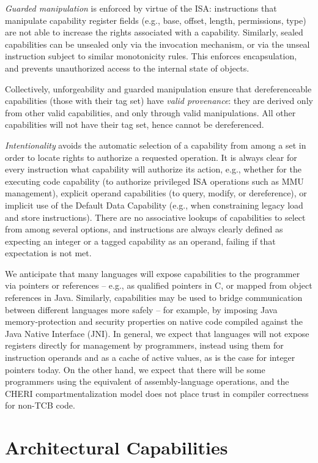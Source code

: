 \textit{Guarded manipulation} is enforced by virtue of the ISA: instructions
that manipulate capability register fields (e.g., base, offset, length,
permissions, type) are not able to increase the rights associated with a
capability.
Similarly, sealed capabilities can be unsealed only via the invocation
mechanism, or via the unseal instruction subject to similar monotonicity
rules.
This enforces encapsulation, and prevents unauthorized access to the internal
state of objects.

Collectively, unforgeability and guarded manipulation ensure that
dereferenceable capabilities (those with their tag set) have \textit{valid
provenance}: they are derived only from other valid capabilities, and only
through valid manipulations.
All other capabilities will not have their tag set, hence cannot be
dereferenced.

\textit{Intentionality} avoids the automatic selection of a capability from
among a set in order to locate rights to authorize a requested operation.
It is always clear for every instruction what capability will authorize its
action,
e.g.,
whether
for the executing code capability (to authorize privileged ISA
operations such as MMU management), explicit operand capabilities (to query,
modify, or dereference), or implicit use of the Default Data Capability (e.g.,
when constraining legacy load and store instructions).
There are no associative lookups of capabilities to select from among several
options, and instructions are always clearly defined as expecting an integer
or a tagged capability as an operand, failing if that expectation is not met.

We anticipate that many languages will expose capabilities to the programmer
via pointers or references -- e.g., as qualified pointers in C, or mapped from
object references in Java.
Similarly, capabilities may be used to bridge communication between different
languages more safely -- for example, by imposing Java memory-protection and
security properties on native code compiled against the Java Native Interface
(JNI).
In general, we expect that languages will not expose registers directly for
management by programmers, instead using them for instruction operands and as
a cache of active values, as is the case for integer pointers today.
On the other hand, we expect that there will be some programmers using the
equivalent of assembly-language operations, and the CHERI compartmentalization
model does not place trust in compiler correctness for non-TCB code.

\section{Architectural Capabilities}
\label{section:architectural-capabilities}

